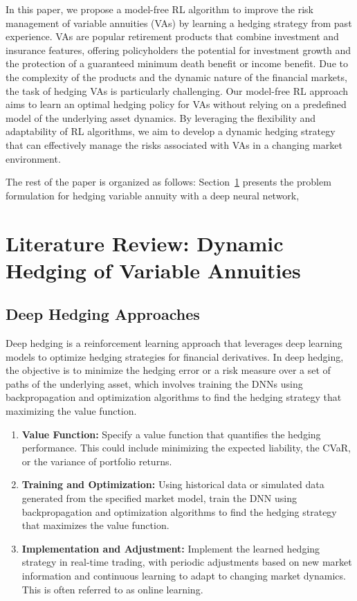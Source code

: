 In this paper, we propose a model-free RL algorithm to improve the risk management of variable annuities (VAs) by learning a hedging strategy from past experience.
VAs are popular retirement products that combine investment and insurance features, offering policyholders the potential for investment growth and the protection of a guaranteed minimum death benefit or income benefit.
Due to the complexity of the products and the dynamic nature of the financial markets, the task of hedging VAs is particularly challenging.
Our model-free RL approach aims to learn an optimal hedging policy for VAs without relying on a predefined model of the underlying asset dynamics.
By leveraging the flexibility and adaptability of RL algorithms, we aim to develop a dynamic hedging strategy that can effectively manage the risks associated with VAs in a changing market environment.

The rest of the paper is organized as follows: Section~\ref{sec3:vaHedging} presents the problem formulation for hedging variable annuity with a deep neural network, 

\section{Literature Review: Dynamic Hedging of Variable Annuities} \label{sec3:vaHedging}


\subsection{Deep Hedging Approaches}

Deep hedging is a reinforcement learning approach that leverages deep learning models to optimize hedging strategies for financial derivatives.
In deep hedging, the objective is to minimize the hedging error or a risk measure over a set of paths of the underlying asset, which involves training the DNNs using backpropagation and optimization algorithms to find the hedging strategy that maximizing the value function.

\begin{enumerate}
    \item \textbf{Value Function:} Specify a value function that quantifies the hedging performance. 
    This could include minimizing the expected liability, the CVaR, or the variance of portfolio returns.
    \item \textbf{Training and Optimization:} Using historical data or simulated data generated from the specified market model, train the DNN using backpropagation and optimization algorithms to find the hedging strategy that maximizes the value function.
    \item \textbf{Implementation and Adjustment:} Implement the learned hedging strategy in real-time trading, with periodic adjustments based on new market information and continuous learning to adapt to changing market dynamics. This is often referred to as online learning.
\end{enumerate}

